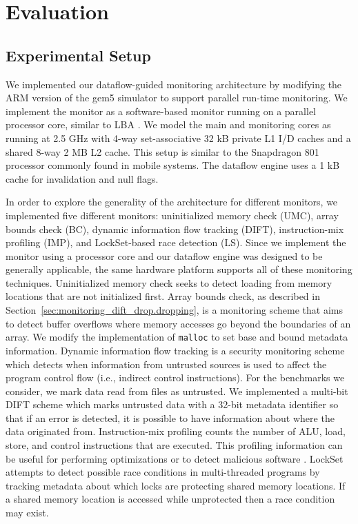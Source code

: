 \section{Evaluation}
\label{sec:monitoring_dift_drop.evaluation}

\subsection{Experimental Setup}
\label{sec:monitoring_dift_drop.evaluation.setup}

We implemented our dataflow-guided monitoring architecture by modifying the ARM
version of the gem5 simulator \cite{gem5} to support parallel run-time
monitoring. We implement the monitor as a software-based monitor running on a
parallel processor core, similar to LBA \cite{lba-asid06}.  We model the main
and monitoring cores as running at 2.5 GHz with 4-way set-associative 32 kB
private L1 I/D caches and a shared 8-way 2 MB L2 cache. This setup is similar
to the Snapdragon 801 processor commonly found in mobile systems. The dataflow
engine uses a 1 kB cache for invalidation and null flags.

In order to explore the generality of the architecture for different monitors,
we implemented five different monitors: uninitialized memory check (UMC), array
bounds check (BC), dynamic information flow tracking (DIFT), instruction-mix
profiling (IMP), and LockSet-based race detection (LS).  Since we implement the
monitor using a processor core and our dataflow engine was designed to be
generally applicable, the same hardware platform supports all of these
monitoring techniques.  Uninitialized memory check seeks to detect loading from
memory locations that are not initialized first. Array bounds check, as
described in Section~\ref{sec:monitoring_dift_drop.dropping}, is a monitoring
scheme that aims to detect buffer overflows where memory accesses go beyond the
boundaries of an array. We modify the implementation of {\tt malloc} to set
base and bound metadata information. Dynamic information flow tracking is a
security monitoring scheme which detects when information from untrusted
sources is used to affect the program control flow (i.e., indirect control
instructions). For the benchmarks we consider, we mark data read from files as
untrusted. We implemented a multi-bit DIFT scheme which marks untrusted data
with a 32-bit metadata identifier so that if an error is detected, it is
possible to have information about where the data originated from.
Instruction-mix profiling counts the number of ALU, load, store, and control
instructions that are executed. This profiling information can be useful for
performing optimizations or to detect malicious software \cite{tang-raid14}.
LockSet \cite{eraser-tocs97} attempts to detect possible race conditions in
multi-threaded programs by tracking metadata about which locks are protecting
shared memory locations. If a shared memory location is accessed while
unprotected then a race condition may exist.

